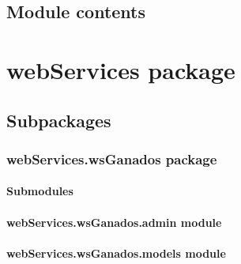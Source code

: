 \documentclass[letterpaper,10pt,english]{sphinxmanual}
\begin{document}
\begin{fulllineitems}
\label{reports:reports.views.view_report_female}
\end{fulllineitems}



\subsection{Module contents}
\label{reports:module-contents}\label{reports:module-reports}

\section{webServices package}
\label{webServices:webservices-package}\label{webServices::doc}

\subsection{Subpackages}
\label{webServices:subpackages}

\subsubsection{webServices.wsGanados package}
\label{webServices.wsGanados::doc}\label{webServices.wsGanados:webservices-wsganados-package}

\paragraph{Submodules}
\label{webServices.wsGanados:submodules}

\paragraph{webServices.wsGanados.admin module}
\label{webServices.wsGanados:module-webServices.wsGanados.admin}\label{webServices.wsGanados:webservices-wsganados-admin-module}

\paragraph{webServices.wsGanados.models module}
\label{webServices.wsGanados:module-webServices.wsGanados.models}\label{webServices.wsGanados:webservices-wsganados-models-module}
\end{document}
